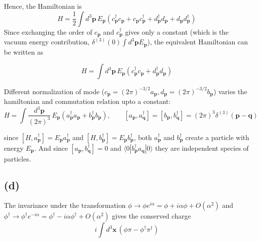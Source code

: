 \documentclass[a4paper,11pt]{article}
\begin{document}
Hence, the Hamiltonian is
\begin{equation}
    H = \frac{1}{2}\int d^3\mathbf{p}\, E_{\mathbf{p}}\left(c_{\mathbf{p}}^\dagger c_{\mathbf{p}} + c_{\mathbf{p}} c_{\mathbf{p}}^\dagger + d_{\mathbf{p}}^\dagger d_{\mathbf{p}} + d_{\mathbf{p}} d_{\mathbf{p}}^\dagger\right)
\end{equation}
Since exchanging the order of $c_{\mathbf{p}}$ and $c_{\mathbf{p}}^\dagger$ gives only a constant (which is the vacuum energy contribution, $\delta^{(3)}(0)\int d^3\mathbf{p} E_{\mathbf{p}}$), the equivalent Hamiltonian can be written as

\begin{equation}
    H = \int d^3\mathbf{p}\, E_{\mathbf{p}}\left(c_{\mathbf{p}}^\dagger c_{\mathbf{p}} + d_{\mathbf{p}}^\dagger d_{\mathbf{p}}\right)
\end{equation}

Different normalization of mode ($c_{\mathbf{p}}=(2\pi)^{-3/2}a_{\mathbf{p}}, d_{\mathbf{p}}=(2\pi)^{-3/2}b_{\mathbf{p}}$) varies the hamiltonian and commutation relation upto a constant:
\begin{equation}
    H = \int \frac{d^3\mathbf{p}}{(2\pi)^3}\, E_{\mathbf{p}}\left(a_\mathbf{p}^\dagger a_\mathbf{p} + b_\mathbf{p}^\dagger b_\mathbf{p}\right), \qquad [a_\mathbf{p}, a_\mathbf{q}^\dagger] = [b_\mathbf{p}, b_\mathbf{q}^\dagger] = (2\pi)^3\delta^{(3)}(\mathbf{p}-\mathbf{q})
\end{equation}

since $[H, a_{\mathbf{p}}^\dagger] = E_{\mathbf{p}}a_{\mathbf{p}}^\dagger$ and $[H, b_{\mathbf{p}}^\dagger] = E_{\mathbf{p}}b_{\mathbf{p}}^\dagger$, both $a_{\mathbf{p}}^\dagger$ and $b_{\mathbf{p}}^\dagger$ create a particle with energy $E_{\mathbf{p}}$. And since $[a_{\mathbf{p}}, b_{\mathbf{q}}^\dagger] = 0$ and $\langle 0|b_{\mathbf{p}}^\dagger a_{\mathbf{q}}|0\rangle$ they are independent species of particles.  


\subsection{(d)}

The invariance under the transformation $\phi \to \phi e^{i\alpha}= \phi+ i\alpha\phi + O(\alpha^2)$ and $\phi^\dagger \to \phi^\dagger e^{-i\alpha}= \phi^\dagger - i\alpha\phi^\dagger + O(\alpha^2)$ gives the conserved charge
\begin{equation}
    i\int d^3\mathbf{x}\, \left(\phi\pi - \phi^\dagger\pi^\dagger\right)
\end{equation}
\end{document}

